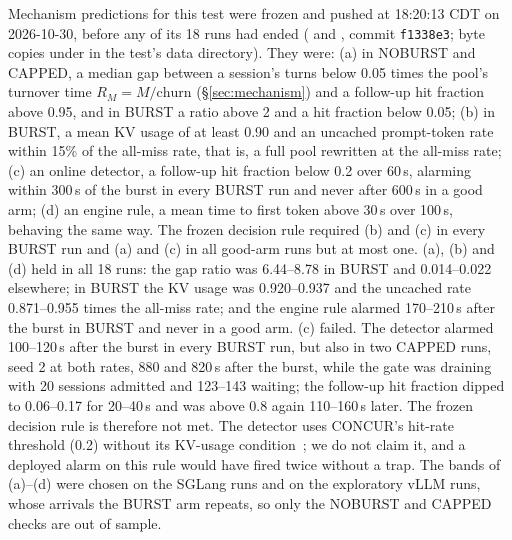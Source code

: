 Mechanism predictions for this test were frozen and pushed at 18:20:13 CDT on 2026-10-30, before any of its 18 runs had ended ( and , commit \texttt{f1338e3}; byte copies under  in the test's data directory). They were: (a) in NOBURST and CAPPED, a median gap between a session's turns below 0.05 times the pool's turnover time $R_M=M/\text{churn}$ (\S\ref{sec:mechanism}) and a follow-up hit fraction above 0.95, and in BURST a ratio above 2 and a hit fraction below 0.05; (b) in BURST, a mean KV usage of at least 0.90 and an uncached prompt-token rate within 15\% of the all-miss rate, that is, a full pool rewritten at the all-miss rate; (c) an online detector, a follow-up hit fraction below 0.2 over 60\,s, alarming within 300\,s of the burst in every BURST run and never after 600\,s in a good arm; (d) an engine rule, a mean time to first token above 30\,s over 100\,s, behaving the same way. The frozen decision rule required (b) and (c) in every BURST run and (a) and (c) in all good-arm runs but at most one. (a), (b) and (d) held in all 18 runs: the gap ratio was 6.44--8.78 in BURST and 0.014--0.022 elsewhere; in BURST the KV usage was 0.920--0.937 and the uncached rate 0.871--0.955 times the all-miss rate; and the engine rule alarmed 170--210\,s after the burst in BURST and never in a good arm. (c) failed. The detector alarmed 100--120\,s after the burst in every BURST run, but also in two CAPPED runs, seed 2 at both rates, 880 and 820\,s after the burst, while the gate was draining with 20 sessions admitted and 123--143 waiting; the follow-up hit fraction dipped to 0.06--0.17 for 20--40\,s and was above 0.8 again 110--160\,s later. The frozen decision rule is therefore not met. The detector uses CONCUR's hit-rate threshold (0.2) without its KV-usage condition~\citep{chen2026concur}; we do not claim it, and a deployed alarm on this rule would have fired twice without a trap. The bands of (a)--(d) were chosen on the SGLang runs and on the exploratory vLLM runs, whose arrivals the BURST arm repeats, so only the NOBURST and CAPPED checks are out of sample.

